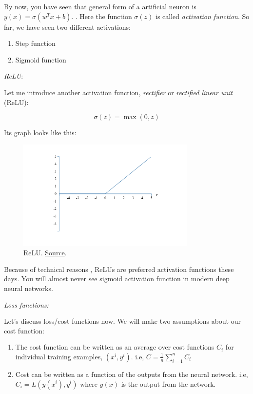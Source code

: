 \documentclass[a4paper]{tufte-handout}
\begin{document}
By now, you have seen that general form of a artificial neuron is
\(y(x) = \sigma\left( w^T x + b\right)\).
. Here the function \(\sigma(z)\) is called \emph{activation
function}. So far, we have seen two different activations:

\begin{enumerate}
\item
  Step function
\item
  Sigmoid function
\end{enumerate}

\noindent \emph{ReLU}:

Let me introduce another activation function, \emph{rectifier} or
\emph{rectified linear unit} (ReLU):

\[\sigma(z) = \max(0, z)\]

Its graph looks like this: 

\begin{figure}
\includegraphics[height=55mm]{relu}
\caption{ ReLU.
\href{http://neuralnetworksanddeeplearning.com/chap3.html}{Source}. }
\end{figure}

Because of technical reasons 
,
ReLUs are preferred activation functions these days. You will almost
never see sigmoid activation function in modern deep neural networks.

\hfill

\noindent \emph{Loss functions:}

Let's discuss loss/cost functions now. We will make two assumptions
about our cost function:

\begin{enumerate}
\item
  The cost function can be written as an average over cost functions
  \(C_i\) for individual training examples, \((x^i, y^i)\). i.e,
  \(C = \frac{1}{n} \sum_{i = 1}^{n} C_i\)
\item
  Cost can be written as a function of the outputs from the neural
  network. i.e, \(C_i = L(y(x^i), y^i)\) where \(y(x)\) is the output
  from the network.
\end{enumerate}
\end{document}
